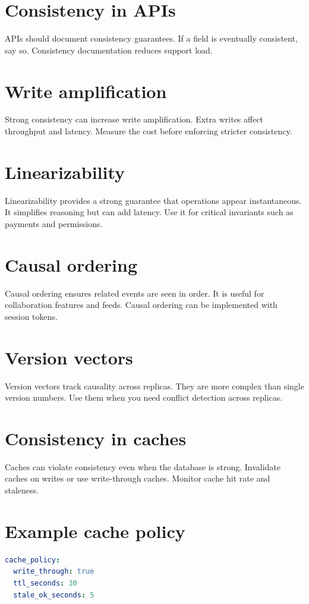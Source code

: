 \section{Consistency in APIs}
APIs should document consistency guarantees.
If a field is eventually consistent, say so.
Consistency documentation reduces support load.

\section{Write amplification}
Strong consistency can increase write amplification.
Extra writes affect throughput and latency.
Measure the cost before enforcing stricter consistency.

\section{Linearizability}
Linearizability provides a strong guarantee that operations appear instantaneous.
It simplifies reasoning but can add latency.
Use it for critical invariants such as payments and permissions.

\section{Causal ordering}
Causal ordering ensures related events are seen in order.
It is useful for collaboration features and feeds.
Causal ordering can be implemented with session tokens.

\section{Version vectors}
Version vectors track causality across replicas.
They are more complex than single version numbers.
Use them when you need conflict detection across replicas.

\section{Consistency in caches}
Caches can violate consistency even when the database is strong.
Invalidate caches on writes or use write-through caches.
Monitor cache hit rate and staleness.

\section{Example cache policy}
\begin{lstlisting}[language=YAML]
cache_policy:
  write_through: true
  ttl_seconds: 30
  stale_ok_seconds: 5
\end{lstlisting}


